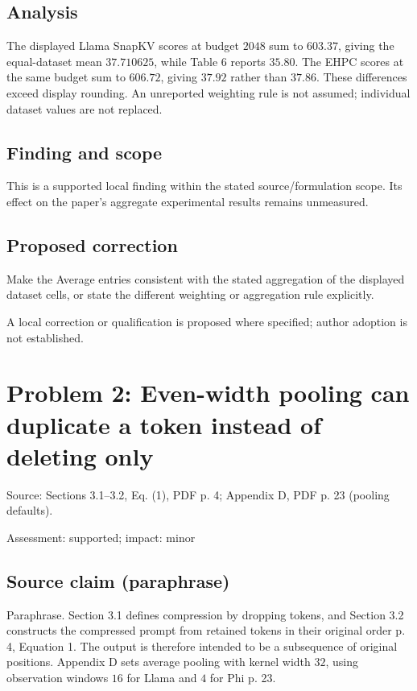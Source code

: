 \documentclass[11pt]{article}
\begin{document}
\subsection*{Analysis}

The displayed Llama SnapKV scores at budget \(2048\) sum to \(603.37\), giving the equal-dataset mean \(37.710625\), while Table 6 reports \(35.80\). The EHPC scores at the same budget sum to \(606.72\), giving \(37.92\) rather than \(37.86\). These differences exceed display rounding. An unreported weighting rule is not assumed; individual dataset values are not replaced.

\subsection*{Finding and scope}

This is a supported local finding within the stated source/formulation scope. Its effect on the paper's aggregate experimental results remains unmeasured.

\subsection*{Proposed correction}

Make the Average entries consistent with the stated aggregation of the displayed dataset cells, or state the different weighting or aggregation rule explicitly.

A local correction or qualification is proposed where specified; author adoption is not established.

\section*{Problem 2: Even-width pooling can duplicate a token instead of deleting only}

Source: Sections 3.1–3.2, Eq. (1), PDF p. 4; Appendix D, PDF p. 23 (pooling defaults).

Assessment: supported; impact: minor

\subsection*{Source claim (paraphrase)}

Paraphrase. Section 3.1 defines compression by dropping tokens, and Section 3.2 constructs the compressed prompt from retained tokens in their original order p. 4, Equation 1. The output is therefore intended to be a subsequence of original positions. Appendix D sets average pooling with kernel width \(32\), using observation windows \(16\) for Llama and \(4\) for Phi p. 23.
\end{document}
